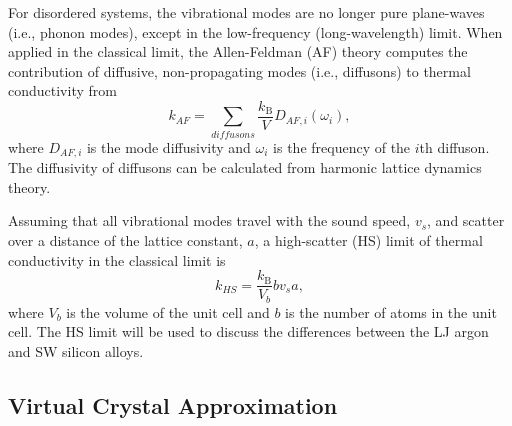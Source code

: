 \documentclass[aps,prb,onecolumn,preprint,footinbib,superscriptaddress,amsmath,amssymb,floatfix]{revtex4}
\begin{document}
For disordered systems, the vibrational modes are no 
longer pure plane-waves (i.e., phonon modes), except in the low-frequency 
(long-wavelength) limit. When applied in the classical limit, 
the Allen-Feldman (AF) theory computes 
the contribution of diffusive, non-propagating modes (i.e., diffusons) 
to thermal conductivity from\cite{allen_thermal_1993} 
\begin{equation}\label{EQ:M:k_AF}
k_{AF} = \sum_{diffusons} \frac{k_{\text{B}}}{V} D_{AF,i}(\omega_i),
\end{equation}
where $D_{AF,i}$ is the mode diffusivity and $\omega_i$ is the 
frequency of the $i$th diffuson. The diffusivity of diffusons 
can be calculated from harmonic lattice dynamics theory.
\cite{allen_thermal_1993,feldman_thermal_1993,feldman_numerical_1999} 

Assuming that all vibrational modes travel with the sound speed, $v_s$, and 
scatter over a distance of the lattice constant, $a$, 
a high-scatter (HS) limit of thermal conductivity in the classical 
limit is\cite{cahill_lattice_1988} 
\begin{equation}\label{EQ:M:k_AF,HS}
k_{HS} = \frac{k_{\text{B}}}{V_b}b v_s a,
\end{equation}
where $V_b$ is the volume of the unit cell and $b$ is the number of atoms 
in the unit cell. The HS limit will be used to 
discuss the differences between the LJ argon and SW silicon alloys. 


\subsection{\label{S:Virtual Crystal}Virtual Crystal Approximation}
\end{document}
